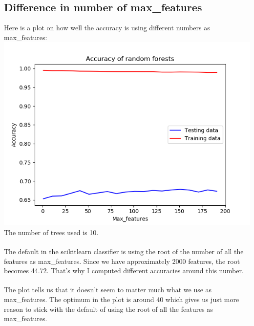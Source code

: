 \documentclass[a4paper,norsk]{article}
\begin{document}
\subsection{Difference in number of max\_features}
Here is a plot on how well the accuracy is using different numbers as max\_features:\\
\includegraphics[scale=.7]{images/Max_featuresplot}\\
The number of trees used is 10.\\
\\
The default in the scikitlearn classifier is using the root of the number of all the features as max\_features. Since we have approximately 2000 features, the root becomes 44.72. That's why I computed different accuracies around this number.\\
\\
The plot tells us that it doesn't seem to matter much what we use as max\_features. The optimum in the plot is around 40 which gives us just more reason to stick with the default of using the root of all the features as max\_features.
\end{document}
